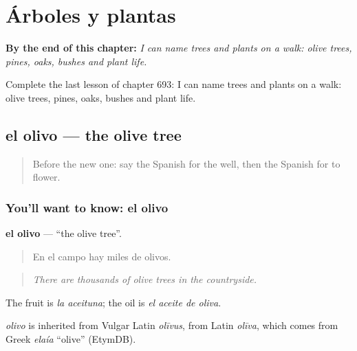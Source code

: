 
\chapter{Árboles y plantas}
\label{ch:es-arboles-y-plantas}

\begin{chapteropening}
\textbf{By the end of this chapter:} \emph{I can name trees and plants on a walk: olive trees, pines, oaks, bushes and plant life.}

Complete the last lesson of chapter 693: I can name trees and plants on a walk: olive trees, pines, oaks, bushes and plant life.
\end{chapteropening}

\section[el olivo]{el olivo — the olive tree}

\label{lesson:ES-C693-olivo}



\begin{quote}
Before the new one: say the Spanish for the well, then the Spanish for to flower.
\end{quote}

\subsection*{You'll want to know: el olivo}
\textbf{el olivo} — \textquotedblleft{}the olive tree\textquotedblright{}.

\begin{quote}
En el campo hay miles de olivos.
\end{quote}

\begin{quote}
\emph{There are thousands of olive trees in the countryside.}
\end{quote}

The fruit is \emph{la aceituna}; the oil is \emph{el aceite de oliva}.

\begin{cousinweb}
\emph{olivo} is inherited from Vulgar Latin \emph{olīvus}, from Latin \emph{olīva}, which comes from Greek \emph{elaía} \textquotedblleft{}olive\textquotedblright{} (EtymDB).
\end{cousinweb}

